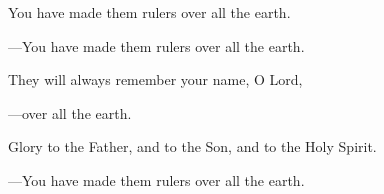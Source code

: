 \responsory

\begin{hangpar}
You have made them rulers over all the earth.

{\color{red}---\thinspace}You have made them rulers over all the earth.

\medskip They will always remember your name, O Lord,

{\color{red}---\thinspace}over all the earth.

\medskip Glory to the Father, and to the Son, and to the Holy Spirit.

{\color{red}---\thinspace}You have made them rulers over all the earth.
\end{hangpar}
